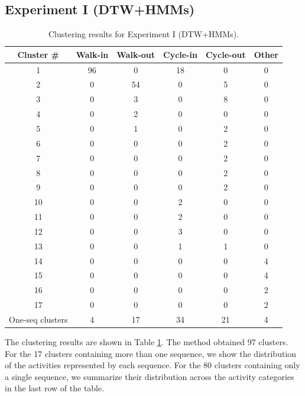 \subsection{Experiment I (DTW+HMMs)}

\begin{table}[t]
  \caption[Clustering results for Experiment I (DTW+HMMs).]{\small
    Clustering results for Experiment I (DTW+HMMs).}
  \label{tab:dtw-and-hmm-assoc-matrix}
  \begin{center}
    \begin{tabular}{c|c|c|c|c|c}
      \hline
      Cluster \# & Walk-in & Walk-out & Cycle-in & Cycle-out & Other \\ 
      \hline \hline
      1  & 96 & 0  & 18 & 0 & 0 \\ \hline
      2  & 0  & 54 & 0  & 5 & 0 \\ \hline
      3  & 0  & 3  & 0  & 8 & 0 \\ \hline
      4  & 0  & 2  & 0  & 0 & 0 \\ \hline
      5  & 0  & 1  & 0  & 2 & 0 \\ \hline
      6  & 0  & 0  & 0  & 2 & 0 \\ \hline
      7  & 0  & 0  & 0  & 2 & 0 \\ \hline
      8  & 0  & 0  & 0  & 2 & 0 \\ \hline
      9  & 0  & 0  & 0  & 2 & 0 \\ \hline
      10 & 0  & 0  & 2  & 0 & 0 \\ \hline
      11 & 0  & 0  & 2  & 0 & 0 \\ \hline
      12 & 0  & 0  & 3  & 0 & 0 \\ \hline
      13 & 0  & 0  & 1  & 1 & 0 \\ \hline
      14 & 0  & 0  & 0  & 0 & 4 \\ \hline
      15 & 0  & 0  & 0  & 0 & 4 \\ \hline
      16 & 0  & 0  & 0  & 0 & 2 \\ \hline
      17 & 0  & 0  & 0  & 0 & 2 \\ \hline
      One-seq clusters & 4 & 17 & 34 & 21 & 4 \\ \hline
    \end{tabular}
  \end{center}
\end{table}

The clustering results are shown in Table \ref{tab:dtw-and-hmm-assoc-matrix}.
The method obtained 97 clusters. For the 17 clusters containing more than one
sequence, we show the distribution of the activities represented by each
sequence. For the 80 clusters containing only a single sequence, we summarize
their distribution across the activity categories in the last row of the table.

